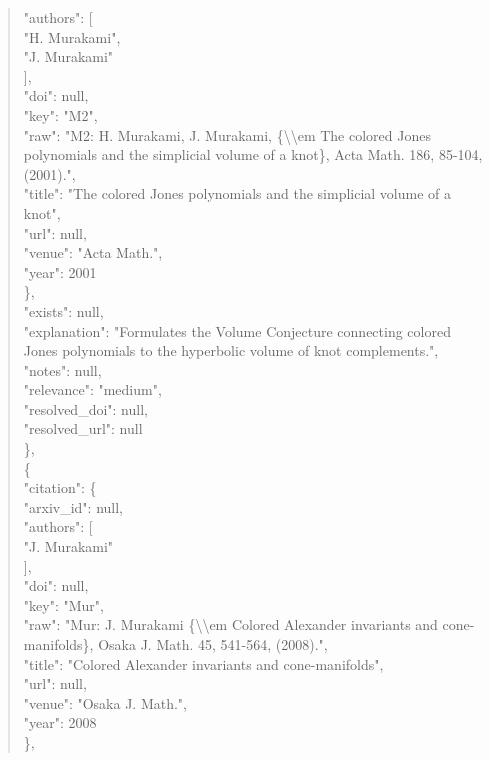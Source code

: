 \documentclass[11pt]{article}
\begin{document}
\begin{quote}
        "authors": [\\
          "H. Murakami",\\
          "J. Murakami"\\
        ],\\
        "doi": null,\\
        "key": "M2",\\
        "raw": "M2: H. Murakami, J. Murakami, \{\textbackslash{}\textbackslash{}em The colored Jones polynomials and the simplicial volume of a knot\}, Acta Math. 186, 85-104, (2001).",\\
        "title": "The colored Jones polynomials and the simplicial volume of a knot",\\
        "url": null,\\
        "venue": "Acta Math.",\\
        "year": 2001\\
      \},\\
      "exists": null,\\
      "explanation": "Formulates the Volume Conjecture connecting colored Jones polynomials to the hyperbolic volume of knot complements.",\\
      "notes": null,\\
      "relevance": "medium",\\
      "resolved\_doi": null,\\
      "resolved\_url": null\\
    \},\\
    \{\\
      "citation": \{\\
        "arxiv\_id": null,\\
        "authors": [\\
          "J. Murakami"\\
        ],\\
        "doi": null,\\
        "key": "Mur",\\
        "raw": "Mur: J. Murakami \{\textbackslash{}\textbackslash{}em Colored Alexander invariants and cone-manifolds\}, Osaka J. Math. 45, 541-564, (2008).",\\
        "title": "Colored Alexander invariants and cone-manifolds",\\
        "url": null,\\
        "venue": "Osaka J. Math.",\\
        "year": 2008\\
      \},\\

\end{quote}
\end{document}
